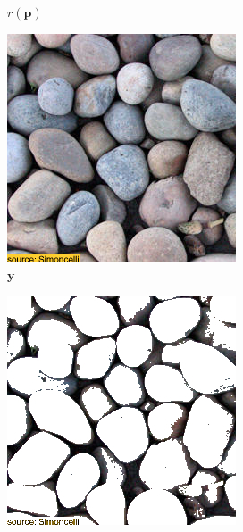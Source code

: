\begin{figure}[]
\begin{subfigure}{\textwidth}
\begin{subfigure}{0.24\textwidth}
            \caption{\(r(\bm{p})\)}
            \label{fig:ex01-pebbles-5steps-some_proj}
        \end{subfigure}
        
        \begin{subfigure}{0.24\textwidth}
            \centering
            \includegraphics[width=\textwidth]{images/04-experiment01/pebbles/target.jpg}
            \caption{\(\bm{y}\)}
            \label{fig:ex01-pebbles-5steps-threshold_target}
        \end{subfigure}
        \hfill
        \begin{subfigure}{0.24\textwidth}
            \centering
            \includegraphics[width=\textwidth]{images/04-experiment01/pebbles/threshold_bg.jpg}

\end{subfigure}
\end{subfigure}
\end{figure}
